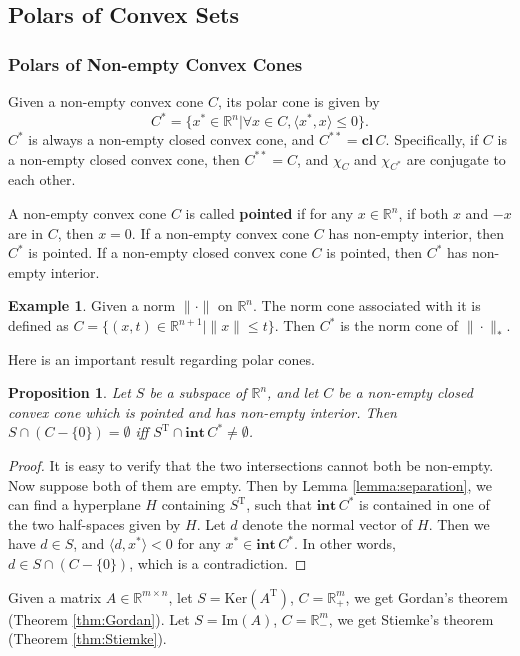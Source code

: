 \documentclass[openany]{book}
\newtheorem{proposition}{Proposition}[chapter]
\theoremstyle{definition}
\newtheorem{example}{Example}[chapter]
\theoremstyle{remark}
\begin{document}
\subsection{Polars of Convex Sets}
\subsubsection{Polars of Non-empty Convex Cones}
Given a non-empty convex cone $C$, its polar cone is given by
\begin{equation*}
    C^*=\{x^*\in \mathbb{R}^n|\forall x\in C,\langle x^*,x\rangle\le0\}.
\end{equation*}
$C^*$ is always a non-empty closed convex cone, and $C^{**}=\mathbf{cl}\,C$. Specifically, if $C$ is a non-empty closed convex cone, then $C^{**}=C$, and $\chi_{C}$ and $\chi_{C^*}$ are conjugate to each other.

A non-empty convex cone $C$ is called \textbf{pointed} if for any $x\in \mathbb{R}^n$, if both $x$ and $-x$ are in $C$, then $x=0$. If a non-empty convex cone $C$ has non-empty interior, then $C^*$ is pointed. If a non-empty closed convex cone $C$ is pointed, then $C^*$ has non-empty interior.

\begin{example}
    Given a norm $\|\cdot\|$ on $\mathbb{R}^n$. The norm cone associated with it is defined as $C=\{(x,t)\in \mathbb{R}^{n+1}|\|x\|\le t\}$. Then $C^*$ is the norm cone of $\|\cdot\|_*$.
\end{example}

Here is an important result regarding polar cones.
\begin{proposition}
    Let $S$ be a subspace of $\mathbb{R}^n$, and let $C$ be a non-empty closed convex cone which is pointed and has non-empty interior. Then $S\cap(C-\{0\})=\emptyset$ iff $S^{\mathrm{T}}\cap \mathbf{int}\,C^*\ne\emptyset$.
\end{proposition}
\begin{proof}
    It is easy to verify that the two intersections cannot both be non-empty. Now suppose both of them are empty. Then by Lemma \ref{lemma:separation}, we can find a hyperplane $H$ containing $S^{\mathrm{T}}$, such that $\mathbf{int}\,C^*$ is contained in one of the two half-spaces given by $H$. Let $d$ denote the normal vector of $H$. Then we have $d\in S$, and $\langle d,x^*\rangle<0$ for any $x^*\in \mathbf{int}\,C^*$. In other words, $d\in S\cap(C-\{0\})$, which is a contradiction.
\end{proof}
Given a matrix $A\in \mathbb{R}^{m\times n}$, let $S=\mathrm{Ker}(A^{\mathrm{T}})$, $C=\mathbb{R}_+^m$, we get Gordan's theorem (Theorem \ref{thm:Gordan}). Let $S=\mathrm{Im}(A)$, $C=\mathbb{R}_-^m$, we get Stiemke's theorem (Theorem \ref{thm:Stiemke}).
\end{document}
